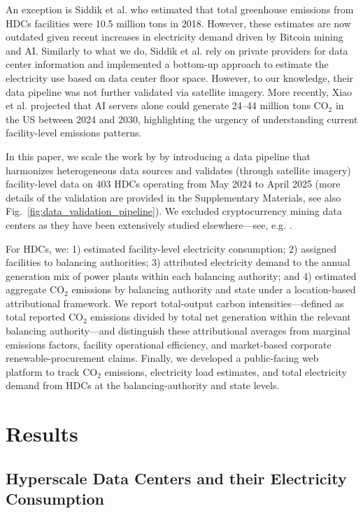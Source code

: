 \documentclass[12pt]{article}
\begin{document}
An exception is Siddik et al.\cite{siddik2021environmental} who estimated that total greenhouse emissions from HDCs facilities were 10.5 million tons in 2018. However, these estimates are now outdated given recent increases in electricity demand driven by Bitcoin mining and AI. Similarly to what we do, Siddik et al. rely on private providers for data center information and implemented a bottom-up approach to estimate the electricity use based on data center floor space. However, to our knowledge, their data pipeline was not further validated via satellite imagery. More recently, Xiao et al. \cite{xiao2025environmental} projected that AI servers alone could generate 24--44 million tons CO$_{2}$ in the US between 2024 and 2030, highlighting the urgency of understanding current facility-level emissions patterns.

In this paper, we scale the work by \cite{siddik2021environmental} by introducing a data pipeline that harmonizes heterogeneous data sources and validates (through satellite imagery) facility-level data on 403 HDCs operating from May 2024 to April 2025 (more details of the validation are provided in the Supplementary Materials, see also Fig.~\ref{fig:data_validation_pipeline}). We excluded cryptocurrency mining data centers as they have been extensively studied elsewhere---see, e.g. \cite{guidi2025environmental,stoll2019carbon}.  

For HDCs, we: 1) estimated facility-level electricity consumption; 2) assigned facilities to balancing authorities; 3) attributed electricity demand to the annual generation mix of power plants within each balancing authority; and 4) estimated aggregate CO$_{2}$ emissions by balancing authority and state under a location-based attributional framework. We report total-output carbon intensities---defined as total reported CO$_2$ emissions divided by total net generation within the relevant balancing authority---and distinguish these attributional averages from marginal emissions factors, facility operational efficiency, and market-based corporate renewable-procurement claims. Finally, we developed a public-facing web platform to track CO$_{2}$ emissions, electricity load estimates, and total electricity demand from HDCs at the balancing-authority and state levels.  

\section*{Results}

\subsection*{Hyperscale Data Centers and their Electricity Consumption}
\end{document}
